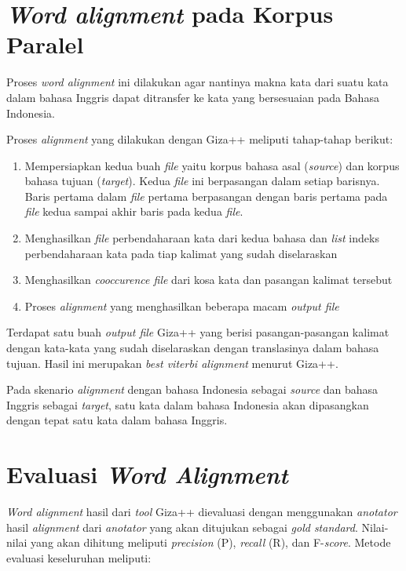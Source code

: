 \section{\textit{Word alignment} pada Korpus Paralel}
Proses \textit{word alignment} ini dilakukan agar nantinya makna kata dari suatu kata dalam bahasa Inggris dapat ditransfer ke kata yang bersesuaian pada Bahasa Indonesia.

Proses \textit{alignment} yang dilakukan dengan Giza++ meliputi tahap-tahap berikut:
\begin{enumerate}
	\item Mempersiapkan kedua buah \textit{file} yaitu korpus bahasa asal (\textit{source}) dan korpus bahasa tujuan (\textit{target}). Kedua \textit{file} ini berpasangan dalam setiap barisnya. Baris pertama dalam \textit{file} pertama berpasangan dengan baris pertama pada \textit{file} kedua sampai akhir baris pada kedua \textit{file}.
	\item Menghasilkan \textit{file} perbendaharaan kata dari kedua bahasa dan \textit{list} indeks perbendaharaan kata pada tiap kalimat yang sudah diselaraskan
	\item Menghasilkan \textit{cooccurence file} dari kosa kata dan pasangan kalimat tersebut
	\item Proses \textit{alignment} yang menghasilkan beberapa macam \textit{output file} 
\end{enumerate}

Terdapat satu buah \textit{output file} Giza++ yang berisi pasangan-pasangan kalimat dengan kata-kata yang sudah diselaraskan dengan translasinya dalam bahasa tujuan. Hasil ini merupakan \textit{best viterbi alignment} menurut Giza++.

Pada skenario \textit{alignment} dengan bahasa Indonesia sebagai \textit{source} dan bahasa Inggris sebagai \textit{target}, satu kata dalam bahasa Indonesia akan dipasangkan dengan tepat satu kata dalam bahasa Inggris.

\section{Evaluasi \textit{Word Alignment}} \label{sec:pembentukanTdanH}
\textit{Word alignment} hasil dari \textit{tool} Giza++ dievaluasi dengan menggunakan \textit{anotator} hasil \textit{alignment} dari \textit{anotator} yang akan ditujukan sebagai \textit{gold standard}. Nilai-nilai yang akan dihitung meliputi \textit{precision} (P), \textit{recall} (R), dan F-\textit{score}. Metode evaluasi keseluruhan meliputi:

